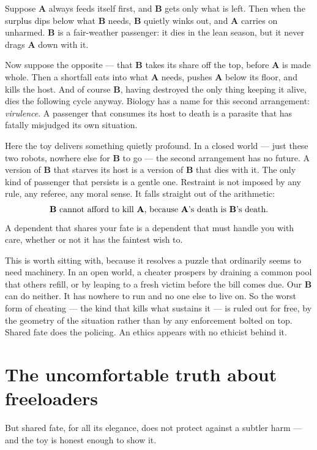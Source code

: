 \documentclass{article}
\begin{document}
Suppose \textbf{A} always feeds itself first, and \textbf{B} gets only what is left. Then when the surplus dips below what \textbf{B} needs, \textbf{B} quietly winks out, and \textbf{A} carries on unharmed. \textbf{B} is a fair-weather passenger: it dies in the lean season, but it never drags \textbf{A} down with it.

Now suppose the opposite --- that \textbf{B} takes its share off the top, before \textbf{A} is made whole. Then a shortfall eats into what \textbf{A} needs, pushes \textbf{A} below its floor, and kills the host. And of course \textbf{B}, having destroyed the only thing keeping it alive, dies the following cycle anyway. Biology has a name for this second arrangement: \emph{virulence}. A passenger that consumes its host to death is a parasite that has fatally misjudged its own situation.

Here the toy delivers something quietly profound. In a closed world --- just these two robots, nowhere else for \textbf{B} to go --- the second arrangement has no future. A version of \textbf{B} that starves its host is a version of \textbf{B} that dies with it. The only kind of passenger that persists is a gentle one. Restraint is not imposed by any rule, any referee, any moral sense. It falls straight out of the arithmetic:
\[
\text{\textbf{B} cannot afford to kill \textbf{A}, because \textbf{A}'s death is \textbf{B}'s death.}
\]
A dependent that shares your fate is a dependent that must handle you with care, whether or not it has the faintest wish to.

This is worth sitting with, because it resolves a puzzle that ordinarily seems to need machinery. In an open world, a cheater prospers by draining a common pool that others refill, or by leaping to a fresh victim before the bill comes due. Our \textbf{B} can do neither. It has nowhere to run and no one else to live on. So the worst form of cheating --- the kind that kills what sustains it --- is ruled out for free, by the geometry of the situation rather than by any enforcement bolted on top. Shared fate does the policing. An ethics appears with no ethicist behind it.

\section*{The uncomfortable truth about freeloaders}

But shared fate, for all its elegance, does not protect against a subtler harm --- and the toy is honest enough to show it.
\end{document}
